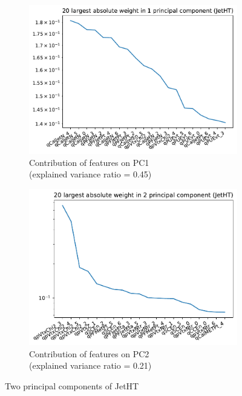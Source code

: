 \begin{figure}[h!]
\begin{subfigure}[b]{0.49\linewidth}
        \includegraphics[width=\linewidth]{images/reco/2018/feature_2/JetHT_pc1.pdf}
        \caption{Contribution of features on PC1 \\ (explained variance ratio = 0.45)}
    \end{subfigure}
    \begin{subfigure}[b]{0.49\linewidth}
        \includegraphics[width=\linewidth]{images/reco/2018/feature_2/JetHT_pc2.pdf}
        \caption{Contribution of features on PC2 \\ (explained variance ratio = 0.21)}
    \end{subfigure}
    \caption{Two principal components of JetHT}
\label{fig:2018_JetHT_subsystem_label}
\end{figure}

